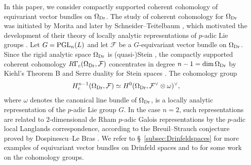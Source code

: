 \documentclass[a4paper,10pt]{amsart}
\theoremstyle{remark}
\theoremstyle{definition}
\theoremstyle{plain}
\numberwithin{equation}{section}
\newcommand{\calF}{{\mathcal F}}
\newcommand{\PGL}{{\rm PGL}}
\begin{document}
In this paper, we consider compactly supported coherent cohomology of equivariant vector bundles on $\Omega_{\rm Dr}$. The study of coherent cohomology for $\Omega_{\rm Dr}$ was initiated by Morita \cite{moritaMurase1982} and later by Schneider--Teitelbaum \cite{schneiderTeitelbaum2002boundary}, which motivated the development of their theory of locally analytic representations of $p$-adic Lie groups \cite{ST02,ST03}. Let $G=\PGL_n(L)$ and let $\calF$ be a $G$-equivariant vector bundle on $\Omega_{\rm Dr}$. Since the rigid analytic space $\Omega_{\rm Dr}$ is (quasi-)Stein \cite[§1, Prop.~4]{SS91}, the compactly supported coherent cohomology $R\Gamma_c(\Omega_{\rm Dr},\calF)$ concentrates in degree $n-1=\dim \Omega_{\rm Dr}$ by Kiehl's Theorem B \cite{kiehl1967theorem} and Serre duality for Stein spaces \cite{chiarellotto1990duality,vanderPut1992}. The cohomology group
\begin{equation}\label{equationcohomology}
	H_c^{n-1}(\Omega_{\rm Dr},\calF)\simeq H^0(\Omega_{\rm Dr}, \calF^{\vee}\otimes \omega)^{\vee},
\end{equation}
where $\omega$ denotes the canonical line bundle of $\Omega_{\rm Dr}$, is a locally analytic representation of the $p$-adic Lie group $G$. In the case $n=2$, such representations are related to $2$-dimensional de Rham $p$-adic Galois representations by the $p$-adic local Langlands correspondence, according to the Breuil--Strauch conjecture proved by Dospinescu--Le Bras \cite{dospinescuLeBras2017revetements}. We refer to \S~\ref{subsec:Drinfeldspaces} for more examples of equivariant vector bundles on Drinfeld spaces and to \cite{schraen2011gl3,breuilQian2026} for some work on the cohomology groups. 
\end{document}
